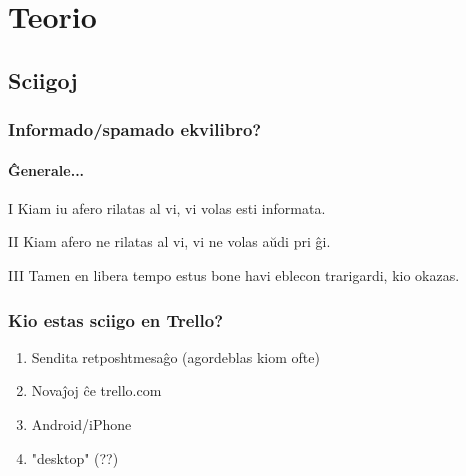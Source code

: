 \section{Teorio}

\subsection{Sciigoj}

  \begin{frame}
    \frametitle{Informado/spamado ekvilibro?}
	\framesubtitle{Ĝenerale...}	
	\pause
	\begin{block}{I}
		Kiam iu afero rilatas al vi, vi volas esti informata.
	\end{block}
	\pause
	\begin{block}{II}
		Kiam afero ne rilatas al vi, vi ne volas aŭdi pri ĝi.
	\end{block}
	\pause
	\begin{block}{III}
		Tamen en libera tempo estus bone havi eblecon trarigardi, kio okazas.
	\end{block}
	
  \end{frame}


  \begin{frame}
    \frametitle{Kio estas sciigo en Trello?}

	\begin{enumerate}
		\item Sendita retposhtmesaĝo (\alert{agordeblas kiom ofte})
		\item Novaĵoj ĉe trello.com
		\item Android/iPhone
		\item "desktop" (??)
	\end{enumerate}
  \end{frame}



